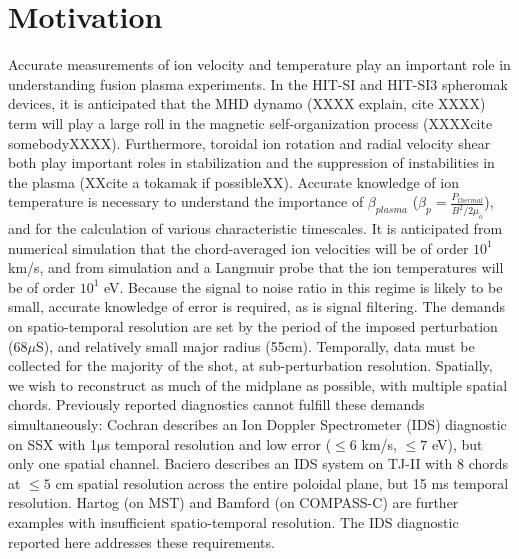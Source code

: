 \documentclass{AIAA}
\begin{document}
\section{Motivation}
\hspace{4ex}Accurate measurements of ion velocity and temperature play an important role in understanding fusion plasma experiments. In the HIT-SI and HIT-SI3 spheromak devices, it is anticipated that the MHD dynamo (XXXX explain, cite XXXX) term will play a large roll in the magnetic self-organization process (XXXXcite somebodyXXXX). Furthermore, toroidal ion rotation and radial velocity shear both play important roles in stabilization and the suppression of instabilities in the plasma (XXcite a tokamak if possibleXX). Accurate knowledge of ion temperature is necessary to understand the importance of $\beta_{plasma}$ ($\beta_p = \frac{P_{thermal}}{B^2/2\mu_o}$), and for the calculation of various characteristic timescales. It is anticipated from numerical simulation\cite{akcay2013extended} that the chord-averaged ion velocities will be of order $10^1$km/s, and from simulation and a Langmuir probe that the ion temperatures will be of order $10^1$ eV. Because the signal to noise ratio in this regime is likely to be small, accurate knowledge of error is required, as is signal filtering. The demands on spatio-temporal resolution are set by the period of the imposed perturbation (68$\mu$S), and relatively small major radius (55cm). Temporally, data must be collected for the majority of the shot, at sub-perturbation resolution. Spatially, we wish to reconstruct as much of the midplane as possible, with multiple spatial chords. Previously reported diagnostics cannot fulfill these demands simultaneously: Cochran \cite{cothran2006fast} describes an Ion Doppler Spectrometer (IDS) diagnostic on SSX with 1$\mathrm{\mu}$s temporal resolution and low error ($\leq6$ km/s, $\leq7$ eV), but only one spatial channel. Baciero \cite{Baciero2001JT-II} describes an IDS system on TJ-II with 8 chords at $\leq5$ cm spatial resolution across the entire poloidal plane, but 15 ms temporal resolution. Hartog \cite{den1994fast} (on MST) and Bamford \cite{bamford1992combination} (on COMPASS-C) are further examples with insufficient spatio-temporal resolution. The IDS diagnostic reported here addresses these requirements.



\end{document}
